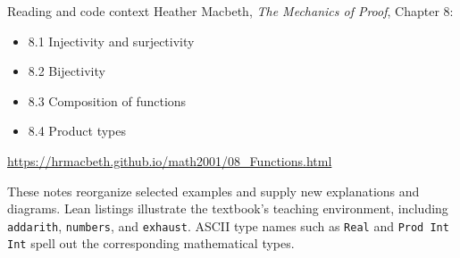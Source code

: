 \begin{frame}{Reading and code context}
Heather Macbeth, \emph{The Mechanics of Proof}, Chapter 8:
\begin{itemize}
\item 8.1 Injectivity and surjectivity
\item 8.2 Bijectivity
\item 8.3 Composition of functions
\item 8.4 Product types
\end{itemize}
\url{https://hrmacbeth.github.io/math2001/08_Functions.html}
\medskip

These notes reorganize selected examples and supply new explanations and diagrams.
Lean listings illustrate the textbook's teaching environment, including
\texttt{addarith}, \texttt{numbers}, and \texttt{exhaust}. ASCII type names such as
\texttt{Real} and \texttt{Prod Int Int} spell out the corresponding mathematical types.
\end{frame}

